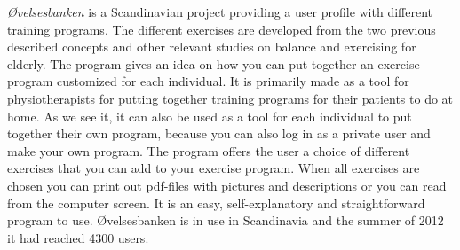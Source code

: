 \emph{{Ø}velsesbanken} is a Scandinavian project providing a user profile with different training programs. The different exercises are developed from the two previous described concepts and other relevant studies on balance and exercising for elderly. The program gives an idea on how you can put together an exercise program customized for each individual. It is primarily made as a tool for physiotherapists for putting together training programs for their patients to do at home. As we see it, it can also be used as a tool for each individual to put together their own program, because you can also log in as a private user and make your own program. The program offers the user a choice of different exercises that you can add to your exercise program. When all exercises are chosen you can print out pdf-files with pictures and descriptions or you can read from the computer screen. It is an easy, self-explanatory and straightforward program to use. {Ø}velsesbanken is in use in Scandinavia and the summer of 2012 it had reached 4300 users. \cite{ovelsesbank}\\ \\


